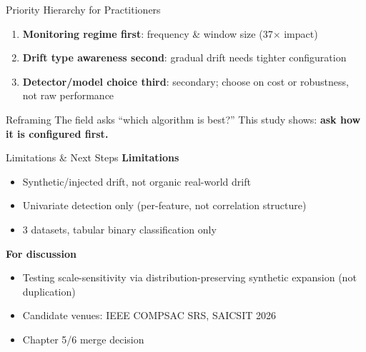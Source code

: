 \documentclass{beamer}
\begin{document}
\begin{frame}{Priority Hierarchy for Practitioners}
\begin{enumerate}
  \item \textbf{Monitoring regime first}: frequency \& window size (37$\times$ impact)
  \item \textbf{Drift type awareness second}: gradual drift needs tighter configuration
  \item \textbf{Detector/model choice third}: secondary; choose on cost or robustness, not raw performance
\end{enumerate}
\vspace{1em}
\begin{block}{Reframing}
The field asks ``which algorithm is best?'' This study shows: \textbf{ask how it is configured first.}
\end{block}
\end{frame}

\begin{frame}{Limitations \& Next Steps}
\textbf{Limitations}
\begin{itemize}
  \item Synthetic/injected drift, not organic real-world drift
  \item Univariate detection only (per-feature, not correlation structure)
  \item 3 datasets, tabular binary classification only
\end{itemize}
\textbf{For discussion}
\begin{itemize}
  \item Testing scale-sensitivity via distribution-preserving synthetic expansion (not duplication)
  \item Candidate venues: IEEE COMPSAC SRS, SAICSIT 2026
  \item Chapter 5/6 merge decision
\end{itemize}
\end{frame}
\end{document}
